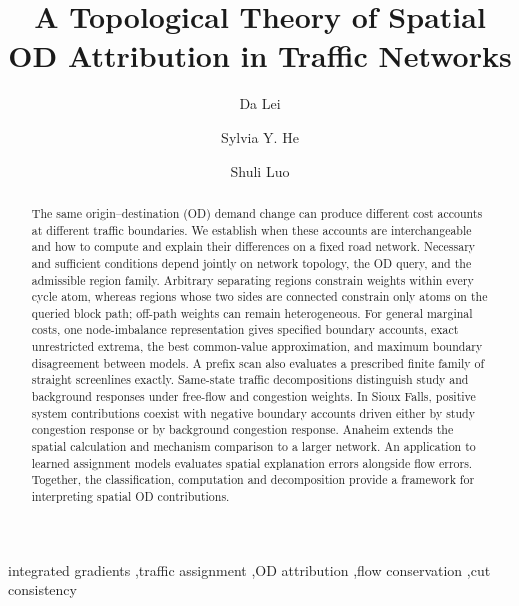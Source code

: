 \documentclass[a4paper,fleqn]{cas-sc}
\begin{document}
\title[mode=title]{A Topological Theory of Spatial OD Attribution in Traffic Networks}
\author[1]{Da Lei}
\author[2]{Sylvia Y. He}
\cormark[1]
\author[3]{Shuli Luo}
\begin{abstract}
The same origin--destination (OD) demand change can produce different cost
accounts at different traffic boundaries. We establish when these accounts
are interchangeable and how to compute and explain their differences on a
fixed road network. Necessary and sufficient conditions depend jointly on
network topology, the OD query, and the admissible region family. Arbitrary
separating regions constrain weights within every cycle atom, whereas regions
whose two sides are connected constrain only atoms on the queried block path;
off-path weights can remain heterogeneous. For general marginal costs, one
node-imbalance representation gives specified boundary accounts, exact
unrestricted extrema, the best common-value approximation, and maximum
boundary disagreement between models. A prefix scan also evaluates a
prescribed finite family of straight screenlines exactly. Same-state traffic
decompositions distinguish study and background responses under free-flow
and congestion weights. In Sioux Falls, positive system contributions coexist
with negative boundary accounts driven either by study congestion response
or by background congestion response. Anaheim extends the spatial calculation
and mechanism comparison to a larger network. An application to learned
assignment models evaluates spatial explanation errors alongside flow errors.
Together, the classification, computation and decomposition provide a
framework for interpreting spatial OD contributions.
\end{abstract}
\begin{keywords}
integrated gradients \sep traffic assignment \sep OD attribution \sep flow conservation \sep cut consistency
\end{keywords}
\maketitle
{}
\end{document}
